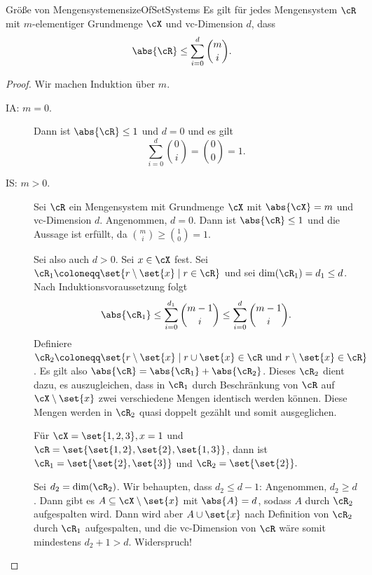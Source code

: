 \documentclass[language=ngerman,algolist,acrolist]{TemplateLecture}
\begin{document}
\begin{lem}{Größe von Mengensystemen}{sizeOfSetSystems}
    Es gilt für jedes Mengensystem $\cR$ mit $m$-elementiger Grundmenge $\cX$ und \ac{vc}-Dimension $d$, dass 
    \begin{equation*}
        \abs{\cR} \leq \sum_{i = 0}^d \binom{m}{i}.
    \end{equation*}
\end{lem}
\begin{proof}
    Wir machen Induktion über $m$.
    \begin{description}
        \item[IA: $m = 0$.] Dann ist $\abs{\cR} \leq 1$ und $d = 0$ und es gilt 
        \begin{equation*}
            \sum_{i = 0}^d \binom{0}{i} = \binom{0}{0} = 1.
        \end{equation*}
        \item[IS: $m > 0$.] Sei $\cR$ ein Mengensystem mit Grundmenge $\cX$ mit $\abs{\cX} = m$ und \ac{vc}-Dimension $d$. Angenommen, $d = 0$. Dann ist $\abs{\cR} \leq 1$ und die Aussage ist erfüllt, da $\binom{m}{i} \geq \binom{1}{0} = 1$. 
        
        Sei also auch $d > 0$. Sei $x \in \cX$ fest. Sei $\cR_1 \coloneqq \set{r \setminus \set{x} \mid r \in \cR}$ und sei $\dim(\cR_1) = d_1 \leq d$. Nach Induktionsvoraussetzung folgt 
        \begin{equation*}
            \abs{\cR_1} \leq \sum_{i = 0}^{d_1} \binom{m-1}{i} \leq \sum_{i = 0}^d \binom{m-1}{i}.
        \end{equation*}
        Definiere $\cR_2 \coloneqq \set{r \setminus \set{x} \mid r \cup \set{x} \in \cR \text{ und } r \setminus \set{x} \in \cR}$. Es gilt also $\abs{\cR} = \abs{\cR_1} + \abs{\cR_2}$. Dieses $\cR_2$ dient dazu, es auszugleichen, dass in $\cR_1$ durch Beschränkung von $\cR$ auf $\cX \setminus \set{x}$ zwei verschiedene Mengen identisch werden können. Diese Mengen werden in $\cR_2$ quasi doppelt gezählt und somit ausgeglichen.
        \begin{example}
            Für $\cX = \set{1,2,3}, x = 1$ und $\cR= \set{\set{1,2}, \set{2}, \set{1,3}}$, dann ist $\cR_1 = \set{\set{2}, \set{3}}$ und $\cR_2 = \set{\set{2}}.$
        \end{example}
        Sei $d_2 = \dim(\cR_2)$. Wir behaupten, dass $d_2 \leq d - 1$: Angenommen, $d_2 \geq d$. Dann gibt es $A \subseteq \cX \setminus \set{x}$ mit $\abs{A} = d$, sodass $A$ durch $\cR_2$ aufgespalten wird. Dann wird aber $A \cup \set{x}$ nach Definition von $\cR_2$ durch $\cR_1$ aufgespalten, und die \ac{vc}-Dimension von $\cR$ wäre somit mindestens $d_2 + 1 > d$. Widerspruch!
        

\end{description}
\end{proof}
\end{document}
